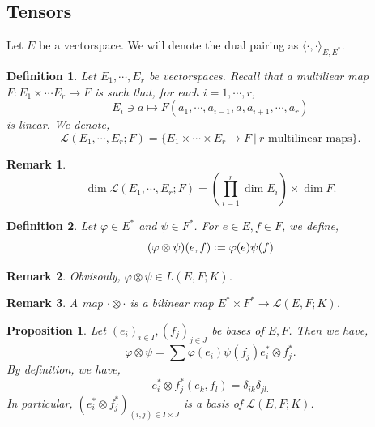 \documentclass[10pt]{article}
\newtheorem{proposition}{Proposition}[section]
\newtheorem{definition}{Definition}[section]
\newtheorem{remark}{Remark}[section]
\newcommand{\defeq}{\vcentcolon=}
\newcommand{\sep}[0]{\:|\:}
\begin{document}
\subsection{Tensors}
Let $E$ be a vectorspace. We will denote the dual pairing as $\langle\cdot,\cdot\rangle_{E,E^*}$. 
\begin{definition}
  Let $E_1,\cdots,E_r$ be vectorspaces. Recall that a multiliear map $F:E_1\times\cdots E_r\to F$ is such that, for each $i=1,\cdots,r$,
  \begin{equation*}
    E_i\ni a\mapsto F(a_1,\cdots,a_{i-1},a,a_{i+1},\cdots,a_r)
  \end{equation*} 
  is linear. We denote,
  \begin{equation*}
    \mathcal{L}(E_1,\cdots,E_r;F) = \{E_1\times\cdots\times E_r\to F\sep \text{$r$-multilinear maps}\}.
  \end{equation*}
\end{definition}
\begin{remark}
  \begin{equation*}
    \dim \mathcal{L}(E_1,\cdots,E_r;F) = \left(\prod_{i=1}^r\dim E_i\right)\times \dim F.
  \end{equation*}
\end{remark}

\begin{definition}
  Let $\varphi\in E^*$ and $\psi\in F^*$. For $e\in E,f\in F$, we define,
  \begin{equation*}
    (\varphi\otimes\psi)(e,f)\defeq \varphi(e)\psi(f)
  \end{equation*}
\end{definition}

\begin{remark}
  Obvisouly, $\varphi\otimes\psi\in L(E,F;K)$.
\end{remark}
\begin{remark}
  A map $\cdot\otimes\cdot$ is a bilinear map $E^*\times F^*\to \mathcal{L}(E,F;K)$.
\end{remark}

\begin{proposition}
  Let $(e_i)_{i\in I},(f_j)_{j\in J}$ be bases of $E,F$. Then we have,
  \begin{equation*}
    \varphi\otimes\psi = \sum\varphi(e_i)\psi(f_j)e_i^*\otimes f_j^*.
  \end{equation*}
  By definition, we have,
  \begin{equation*}
    e_i^*\otimes f_j^*(e_k,f_l) = \delta_{ik}\delta_{jl.}
  \end{equation*}
  In particular, $(e_i^*\otimes f_j^*)_{(i,j)\in I\times J}$ is a basis of $\mathcal{L}(E,F;K)$.
\end{proposition}
\end{document}
